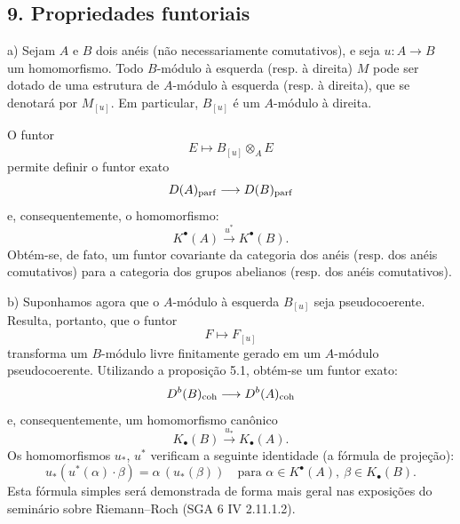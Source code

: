 \subsection*{9. Propriedades funtoriais}

a) Sejam $A$ e $B$ dois anéis (não necessariamente comutativos), e seja $u:A\to B$ um homomorfismo. Todo $B$-módulo à esquerda (resp. à direita) $M$ pode ser dotado de uma estrutura de $A$-módulo à esquerda (resp. à direita), que se denotará por $M_{[u]}$. Em particular, $B_{[u]}$ é um $A$-módulo à direita.

O funtor
\[
E\longmapsto B_{[u]}\otimes_A E
\]
permite definir o funtor exato
\[
D(A)_{\mathrm{parf}}\longrightarrow D(B)_{\mathrm{parf}}
\]
e, consequentemente, o homomorfismo:
\[
K^{\bullet}(A)\xrightarrow{u^*}K^{\bullet}(B).
\]
Obtém-se, de fato, um funtor covariante da categoria dos anéis (resp. dos anéis comutativos) para a categoria dos grupos abelianos (resp. dos anéis comutativos).

b) Suponhamos agora que o $A$-módulo à esquerda $B_{[u]}$ seja pseudocoerente. Resulta, portanto, que o funtor
\[
F\longmapsto F_{[u]}
\]
transforma um $B$-módulo livre finitamente gerado em um $A$-módulo pseudocoerente. Utilizando a proposição 5.1, obtém-se um funtor exato:
\[
D^b(B)_{\mathrm{coh}}\longrightarrow D^b(A)_{\mathrm{coh}}
\]
e, consequentemente, um homomorfismo canônico
\[
K_\bullet(B)\xrightarrow{u_*}K_\bullet(A).
\]
Os homomorfismos $u_*$, $u^*$ verificam a seguinte identidade (a fórmula de projeção):
\[
u_*(u^*(\alpha)\cdot \beta)=\alpha\,(u_*(\beta))
\quad\text{para }\alpha\in K^{\bullet}(A),\ \beta\in K_\bullet(B).
\]
Esta fórmula simples será demonstrada de forma mais geral nas exposições do seminário sobre Riemann--Roch (SGA 6 IV 2.11.1.2).
